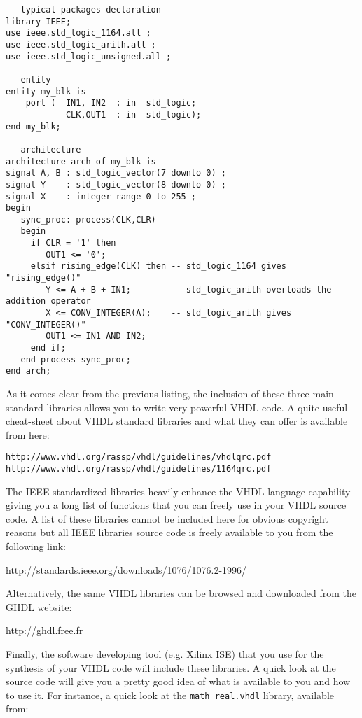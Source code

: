 \begin{lstlisting}[caption=Example of operators and types available with some IEEE packages.]
-- typical packages declaration
library IEEE;
use ieee.std_logic_1164.all ;
use ieee.std_logic_arith.all ;
use ieee.std_logic_unsigned.all ;

-- entity
entity my_blk is 
    port (  IN1, IN2  : in  std_logic; 
            CLK,OUT1  : in  std_logic); 
end my_blk;

-- architecture
architecture arch of my_blk is
signal A, B : std_logic_vector(7 downto 0) ;
signal Y    : std_logic_vector(8 downto 0) ;
signal X    : integer range 0 to 255 ;
begin
   sync_proc: process(CLK,CLR)
   begin
     if CLR = '1' then 
        OUT1 <= '0';  
     elsif rising_edge(CLK) then -- std_logic_1164 gives "rising_edge()"
        Y <= A + B + IN1;        -- std_logic_arith overloads the addition operator
        X <= CONV_INTEGER(A);    -- std_logic_arith gives "CONV_INTEGER()"
        OUT1 <= IN1 AND IN2; 
     end if; 
   end process sync_proc; 
end arch;
\end{lstlisting}
As it comes clear from the previous listing, the inclusion of these three main standard libraries allows you to write very powerful VHDL code. A quite useful cheat-sheet about VHDL standard libraries and what they can offer is available from here:
\begin{verbatim}
http://www.vhdl.org/rassp/vhdl/guidelines/vhdlqrc.pdf
http://www.vhdl.org/rassp/vhdl/guidelines/1164qrc.pdf
\end{verbatim}

The IEEE standardized libraries heavily enhance the VHDL language capability giving you a long list of functions that you can freely use in your VHDL source code. A list of these libraries cannot be included here for obvious copyright reasons but all IEEE libraries source code is freely available to you from the following link:

\url{http://standards.ieee.org/downloads/1076/1076.2-1996/}

Alternatively, the same VHDL libraries can be browsed and downloaded from the GHDL website:

\url{http://ghdl.free.fr}

Finally, the software developing tool (e.g. Xilinx ISE) that you use for the synthesis of your VHDL code will include these libraries. A quick look at the source code will give you a pretty good idea of what is available to you and how to use it. For instance, a quick look at the \texttt{math\_real.vhdl} library, available from: 

